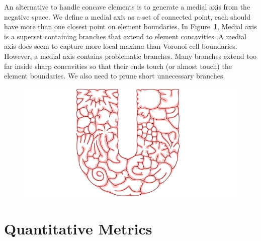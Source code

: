 \newtext
{
An alternative to handle concave elements is to generate a medial axis from the negative space.
We define a medial axis as a set of connected point, each should have more than one closest point on element boundaries.
In Figure~\ref{fig_skeleton}, Medial axis is a superset containing branches that extend to element concavities.
A medial axis does seem to capture more local maxima than Voronoi cell boundaries.
However, a medial axis contains problematic branches.
Many branches extend too far inside sharp concavities so that their ends touch (or almost touch) the element boundaries.
We also need to prune short unnecessary branches.
}



\begin{figure}[t]
\centering
\includegraphics[width=1.0\textwidth]{figures/metrics/unilever_with_skeleton.pdf}
\caption[An example of a skeleton of negative space]
{\label{fig_skeleton}
  }
\end{figure}

\section{Quantitative Metrics}

